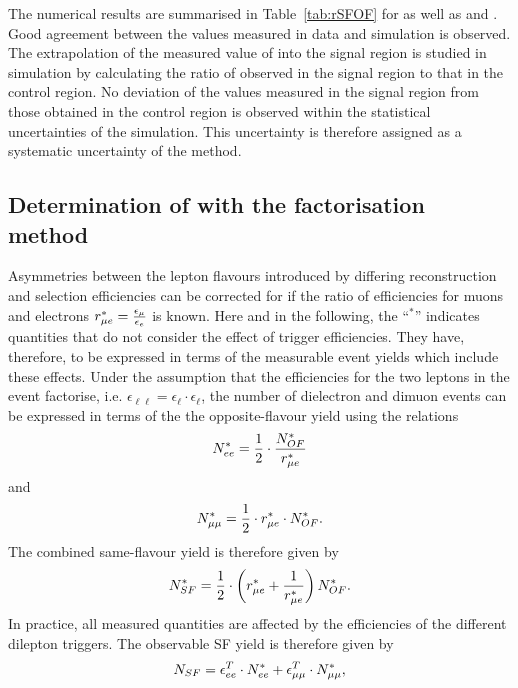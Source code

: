 The numerical results are summarised in Table~\ref{tab:rSFOF} for \Rsfof as well as \Reeof and \Rmmof. Good agreement between the values measured in data and simulation is observed. The extrapolation of the measured value of \Rsfof into the signal region is studied in simulation by calculating the ratio of \Rsfof observed in the signal region to that in the control region. No deviation of the values measured in the signal region from those obtained in the control region is observed within the statistical uncertainties of the simulation. This uncertainty is therefore assigned as a systematic uncertainty of the method. 



\subsection{Determination of \Rsfof with the factorisation method}
\label{sec:rmue}
Asymmetries between the lepton flavours introduced by differing reconstruction and selection efficiencies can be corrected for if the ratio of efficiencies for muons and electrons $r_{\mu e}^{*} = \frac{\epsilon_{\mu}}{\epsilon_{e}}$ is known. Here and in the following, the ``$^{*}$'' indicates quantities that do not consider the effect of trigger efficiencies. They have, therefore, to be expressed in terms of the measurable event yields which include these effects. Under the assumption that the efficiencies for the two leptons in the event factorise, i.e. $\epsilon_{\ell\ell} = \epsilon_{\ell}\cdot\epsilon_{\ell}$, the number of dielectron and dimuon events can be expressed in terms of the the opposite-flavour yield using the relations
\begin{equation}
N_{ee}^{*} = \frac{1}{2}\cdot \frac{N_{OF}^{*}}{r_{\mu e}^{*}}
\end{equation}
and 
\begin{equation}
N_{\mu\mu}^{*} = \frac{1}{2} \cdot r_{\mu e}^{*} \cdot N_{OF}^{*}.
\end{equation}
The combined same-flavour yield is therefore given by
\begin{equation}
N_{SF}^{*} = \frac{1}{2}\cdot \left( r_{\mu e}^{*} + \frac{1}{r_{\mu e}^{*}} \right) N_{OF}^{*}.
\end{equation}
In practice, all measured quantities are affected by the efficiencies of the different dilepton triggers. The observable SF yield is therefore given by
\begin{equation}
N_{SF} = \epsilon_{ee}^T \cdot N_{ee}^{*} + \epsilon_{\mu\mu}^T \cdot N_{\mu\mu}^{*},
\end{equation}
